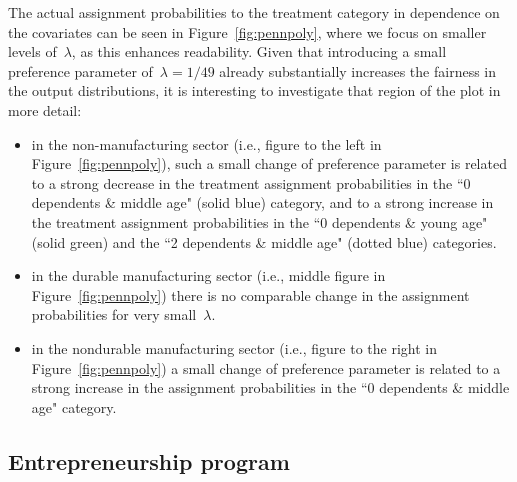 \documentclass[11pt, a4paper]{article}
\theoremstyle{definition}
\begin{document}
The actual assignment probabilities to the treatment category in dependence on the covariates can be seen in Figure~\ref{fig:pennpoly}, where we focus on smaller levels of~$\lambda$, as this enhances readability. Given that introducing a small preference parameter of~$\lambda = 1/49$ already substantially increases the fairness in the output distributions, it is interesting to investigate that region of the plot in more detail:
\begin{itemize}
\item in the non-manufacturing sector (i.e., figure to the left in Figure~\ref{fig:pennpoly}), such a small change of preference parameter is related to a strong decrease in the treatment assignment probabilities in the ``0 dependents \& middle age" (solid blue) category, and to a strong increase in the treatment assignment probabilities in the ``0 dependents \& young age" (solid green) and the  ``2 dependents \& middle age" (dotted blue) categories.
\item in the durable manufacturing sector (i.e., middle figure in Figure~\ref{fig:pennpoly}) there is no comparable change in the assignment probabilities for very small~$\lambda$.
\item in the nondurable manufacturing sector (i.e., figure to the right in Figure~\ref{fig:pennpoly}) a small change of preference parameter is related to a strong increase in the assignment probabilities in the  ``0 dependents \& middle age" category.
\end{itemize} 


\subsection{Entrepreneurship program}
\end{document}
